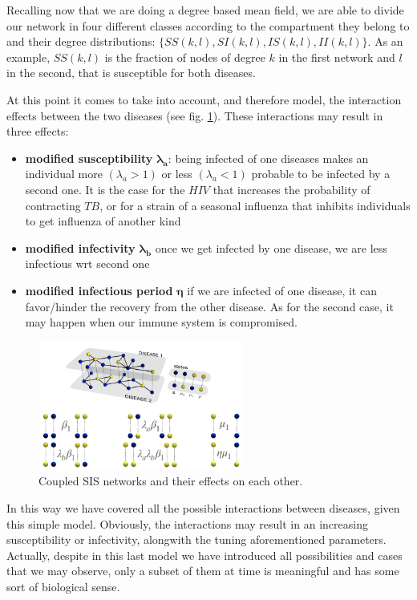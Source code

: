 \documentclass[../main/main.tex]{subfiles}
\begin{document}
Recalling now that we are doing a degree based mean field, we are able to divide our network in four different classes according to the compartment they belong to and their degree distributions: $\{SS(k,l),SI(k,l),IS(k,l),II(k,l) \}$. As an example, $SS(k,l)$ is the fraction of nodes of degree $k$ in the first network and $l$ in the second, that is susceptible for both diseases. 

At this point it comes to take into account, and therefore model, the interaction effects between the two diseases (see fig. \ref{fig:11_004}). These interactions may result in three effects:
\begin{itemize}
    \item \textbf{modified susceptibility} $\mathbf{\lambda_a}$: being infected of one diseases makes an individual more $(\lambda_a > 1)$ or less $(\lambda_a < 1)$ probable to be infected by a second one. It is the case for the $HIV$ that increases the probability of contracting $TB$, or for a strain of a seasonal influenza that inhibits individuals to get influenza of another kind 
    \item \textbf{modified infectivity} $\mathbf{\lambda_b}$ once we get infected by one disease, we are less infectious wrt second one
    \item \textbf{modified infectious period} $\mathbf{\eta}$ if we are infected of one disease, it can favor/hinder the recovery from the other disease. As for the second case, it may happen when our immune system is compromised.
\end{itemize}

\begin{figure}[h!]
\centering
\includegraphics[width=0.6\textwidth]{../lessons/image/11/image004.png}
\caption{\label{fig:11_004} Coupled SIS networks and their effects on each other. }
\end{figure}

In this way we have covered all the possible interactions between diseases, given this simple model. Obviously, the interactions may result in an increasing susceptibility or infectivity, alongwith the tuning aforementioned parameters. Actually, despite in this last model we have introduced all possibilities and cases that we may observe, only a subset of them at time is meaningful and has some sort of biological sense.
\end{document}
